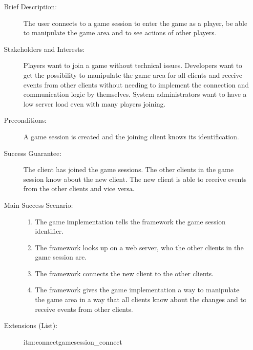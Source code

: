 \begin{description}
  \item[Brief Description:] The user connects to a game session to enter the
  game as a player, be able to manipulate the game area and to see actions of
  other players.
  \item[Stakeholders and Interests:] Players want to join a game without
  technical issues. Developers want to get the possibility to manipulate the
  game area for all clients and receive events from other clients without
  needing to implement the connection and communication logic by themselves.
  System administrators want to have a low server load even with many players
  joining.
  \item[Preconditions:] A game session is created and the joining client knows
  its identification.
  \item[Success Guarantee:] The client has joined the game sessions. The other
  clients in the game session know about the new client. The new client is able
  to receive events from the other clients and vice versa.
  \item[Main Success Scenario:] \hfill
  \begin{enumerate}
    \item The game implementation tells the framework the game session
    identifier.
    \item \label{itm:connectgamesession_lookup} The framework looks up on a
    web server, who the other clients in the game session are.
    \item \label{itm:connectgamesession_connect} The framework connects the new
    client to the other clients.
    \item The framework gives the game implementation a way to manipulate the
    game area in a way that all clients know about the changes and to receive
    events from other clients.
  \end{enumerate}
  \item[Extensions (List):] \hfill
  \begin{refenum}{itm:connectgamesession_connect}

\end{refenum}
\end{description}
